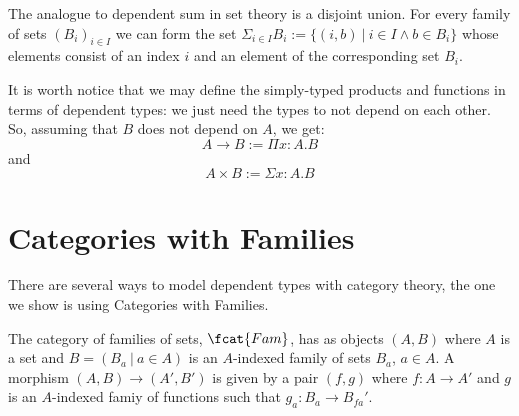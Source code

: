 The analogue to dependent sum in set theory is a disjoint union. For every
family of sets $(B_i)_{i \in I}$ we can form the set $\Sigma_{i \in I} B_i :=
\{ (i, b)~|~i \in I \land b \in B_i\}$ whose elements consist of an index $i$
and an element of the corresponding set $B_i$.

It is worth notice that we may define the simply-typed products and functions
in terms of dependent types: we just need the types to not depend on each
other. So, assuming that $B$ does not depend on $A$, we get:
\[
  A \to B := \Pi x: A. B
\]
and
\[
  A \times B := \Sigma x: A. B
\]

\section*{Categories with Families}

There are several ways to model dependent types with category theory, the one
we show is using Categories with Families.

\begin{definition}
  The category of families of sets, $\fcat{Fam}$, has as objects $(A, B)$ where
  $A$ is a set and $B = (B_a~|~a \in A)$ is an $A$-indexed family of sets $B_a$,
  $a \in A$. A morphism $(A, B) \to (A', B')$ is given by a pair $(f, g)$ where
  $f: A \to A'$ and $g$ is an $A$-indexed famiy of functions such that $g_a: B_a
  \to B_{fa}'$.
\end{definition}

